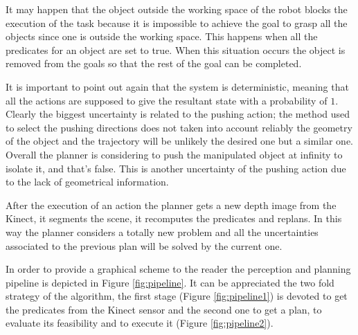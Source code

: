 
It may happen that the object outside the working space of the robot blocks the execution of the task because it is impossible to achieve the goal to grasp all the objects since one is outside the working space.
This happens when all the  predicates for an object are set to true. When this situation occurs the object is removed from the goals so that the rest of the goal can be completed.


It is important to point out again that the system is deterministic, meaning that all the actions are supposed to give the resultant state with a probability of $1$. Clearly the biggest uncertainty is related to the pushing action; the method used to select the pushing directions does not taken into account reliably the geometry of the object and the trajectory will be unlikely the desired one but a similar one. Overall the planner is considering to push the manipulated object at infinity to isolate it, and that's false. This is another uncertainty of the pushing action due to the lack of geometrical information.
 
After the execution of an action the planner gets a new depth image from the Kinect, it segments the scene, it recomputes the predicates and replans. In this way the planner considers a totally new problem and all the uncertainties associated to the previous plan will be solved by the current one. 

In order to provide a graphical scheme to the reader the perception and planning pipeline is depicted in Figure \ref{fig:pipeline}. It can be appreciated the two fold strategy of the algorithm, the first stage (Figure \ref{fig:pipeline1}) is devoted to get the predicates from the Kinect sensor and the second one to get a plan, to evaluate its feasibility and to execute it (Figure \ref{fig:pipeline2}).

